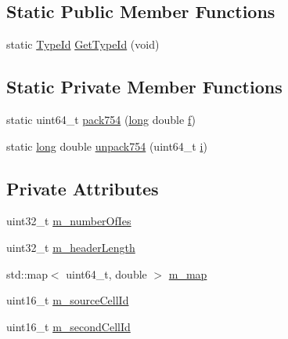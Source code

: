 \subsection*{Static Public Member Functions}
\begin{DoxyCompactItemize}
\item 
static \hyperlink{classns3_1_1TypeId}{Type\+Id} \hyperlink{classns3_1_1EpcX2UeImsiSinrUpdateHeader_ad7989e2bbb6dcbebde567294c1977d79}{Get\+Type\+Id} (void)
\end{DoxyCompactItemize}
\subsection*{Static Private Member Functions}
\begin{DoxyCompactItemize}
\item 
static uint64\+\_\+t \hyperlink{classns3_1_1EpcX2UeImsiSinrUpdateHeader_abdc3f7d5eb846a7bab844952daa4db10}{pack754} (\hyperlink{generate__test__data__lte__sinr_8m_a0eab6be67e93c3411f7a8b53cc297285}{long} double \hyperlink{80211b_8c_ae7ffc1a8f84fa47a0812b2f2b9627132}{f})
\item 
static \hyperlink{generate__test__data__lte__sinr_8m_a0eab6be67e93c3411f7a8b53cc297285}{long} double \hyperlink{classns3_1_1EpcX2UeImsiSinrUpdateHeader_a952cd20b6a8111cb9388cfe8cb7041cd}{unpack754} (uint64\+\_\+t \hyperlink{lte__uplink__power__control_8m_a6f6ccfcf58b31cb6412107d9d5281426}{i})
\end{DoxyCompactItemize}
\subsection*{Private Attributes}
\begin{DoxyCompactItemize}
\item 
uint32\+\_\+t \hyperlink{classns3_1_1EpcX2UeImsiSinrUpdateHeader_a1c2491171afc42c53b0624d73f687a26}{m\+\_\+number\+Of\+Ies}
\item 
uint32\+\_\+t \hyperlink{classns3_1_1EpcX2UeImsiSinrUpdateHeader_a4fa578039d08fdb164b748ec72478c7b}{m\+\_\+header\+Length}
\item 
std\+::map$<$ uint64\+\_\+t, double $>$ \hyperlink{classns3_1_1EpcX2UeImsiSinrUpdateHeader_a917c27de3e79840fbbc85bd72d538519}{m\+\_\+map}
\item 
uint16\+\_\+t \hyperlink{classns3_1_1EpcX2UeImsiSinrUpdateHeader_a501240ac9c8dd81e9f1dff3719c98a2e}{m\+\_\+source\+Cell\+Id}
\item 
uint16\+\_\+t \hyperlink{classns3_1_1EpcX2UeImsiSinrUpdateHeader_add66214d31be980761eb2a0cdd3687a0}{m\+\_\+second\+Cell\+Id}
\end{DoxyCompactItemize}
